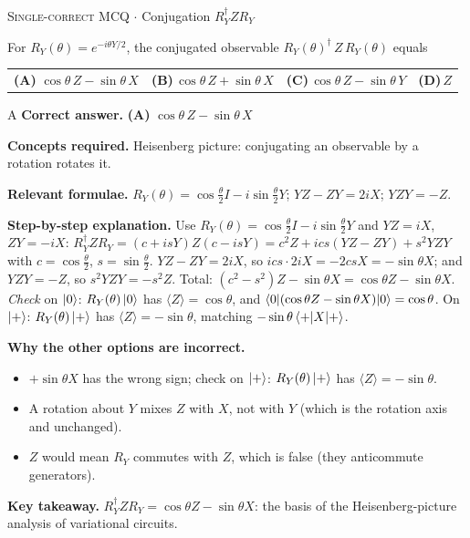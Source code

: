 \documentclass[11pt,a4paper]{article}
\newcommand{\optlabel}[1]{\textbf{(#1)}}
\newcommand{\correctlabel}[1]{\textcolor{okgreen}{\textbf{(#1)}\,\ding{51}}}
\newenvironment{qitem}[1]{\begin{list}{}{\setlength{\leftmargin}{3.3em}\setlength{\labelwidth}{3.1em}%
  \setlength{\labelsep}{0.2em}\setlength{\topsep}{3pt}\setlength{\parsep}{3pt}}\item[\textbf{Q.#1}\hfill]}{\end{list}}
\newcommand{\qsep}{\par\vspace{2pt}{\color{black!15}\hrule}\vspace{4pt}}
\newcommand{\qmeta}[2]{{\footnotesize\color{black!60}\textsc{#1} \;$\cdot$\; #2}\par}
\begin{document}
\begin{qitem}{31}
\qmeta{Single-correct MCQ}{Conjugation $R_Y^\dagger ZR_Y$}
For $R_Y(\theta) = e^{-i\theta Y/2}$, the conjugated observable $R_Y(\theta)^\dagger\, Z\, R_Y(\theta)$ equals
\par\smallskip\noindent\begin{tabularx}{\linewidth}{@{}*{4}{L}@{}}
\correctlabel{A}\,$\cos\theta\,Z - \sin\theta\,X$ & \optlabel{B}\,$\cos\theta\,Z + \sin\theta\,X$ & \optlabel{C}\,$\cos\theta\,Z - \sin\theta\,Y$ & \optlabel{D}\,$Z$
\end{tabularx}
\end{qitem}
\begin{solbox}{A}
\textbf{\color{brand}Correct answer.} \textcolor{okgreen}{\textbf{(A)}} $\cos\theta\,Z - \sin\theta\,X$

\textbf{\color{brand}Concepts required.} Heisenberg picture: conjugating an observable by a rotation rotates it.

\textbf{\color{brand}Relevant formulae.} $R_Y(\theta) = \cos\frac\theta2I - i\sin\frac\theta2Y$; $YZ - ZY = 2iX$; $YZY = -Z$.

\textbf{\color{brand}Step-by-step explanation.} Use $R_Y(\theta) = \cos\frac\theta2 I - i\sin\frac\theta2 Y$ and $YZ = iX$, $ZY = -iX$:
$R_Y^\dagger Z R_Y = (c + isY)Z(c - isY) = c^2Z + ics(YZ - ZY) + s^2YZY$ with $c = \cos\frac\theta2$, $s = \sin\frac\theta2$.
$YZ - ZY = 2iX$, so $ics\cdot2iX = -2csX = -\sin\theta X$; and $YZY = -Z$, so $s^2YZY = -s^2Z$. Total:
$(c^2 - s^2)Z - \sin\theta X = \cos\theta Z - \sin\theta X$.
\emph{Check} on $\ket0$: $R_Y(\theta)\ket0$ has $\langle Z\rangle = \cos\theta$, and $\braket{0|(\cos\theta Z - \sin\theta X)|0} = \cos\theta$. On $\ket+$:
$R_Y(\theta)\ket+$ has $\langle Z\rangle = -\sin\theta$, matching $-\sin\theta\braket{+|X|+}$.

\textbf{\color{brand}Why the other options are incorrect.}
\begin{itemize}[leftmargin=2.4em, itemsep=1pt, topsep=2pt]
\item[\textbf{(B)}] $+\sin\theta X$ has the wrong sign; check on $\ket+$: $R_Y(\theta)\ket+$ has $\langle Z\rangle = -\sin\theta$.
\item[\textbf{(C)}] A rotation about $Y$ mixes $Z$ with $X$, not with $Y$ (which is the rotation axis and unchanged).
\item[\textbf{(D)}] $Z$ would mean $R_Y$ commutes with $Z$, which is false (they anticommute generators).
\end{itemize}
\textbf{\color{brand}Key takeaway.} $R_Y^\dagger ZR_Y = \cos\theta Z - \sin\theta X$: the basis of the Heisenberg-picture analysis of variational circuits.
\end{solbox}
\qsep
\end{document}
